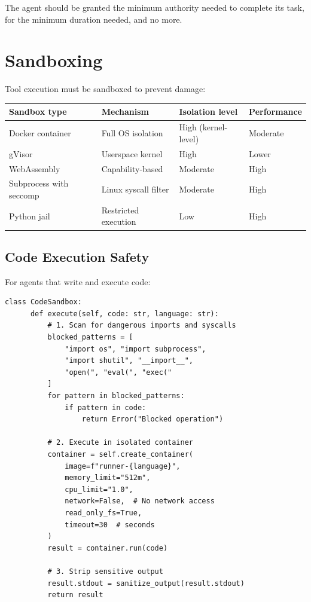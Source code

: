 \begin{definition}
	The agent should be granted the minimum authority needed to complete its task, for the minimum duration needed, and no more.
\end{definition}

\section{Sandboxing}

Tool execution must be sandboxed to prevent damage:

\begin{longtable}{p{3cm}p{4cm}p{4cm}p{3cm}}
	\toprule
	\textbf{Sandbox type}   & \textbf{Mechanism}   & \textbf{Isolation level} & \textbf{Performance} \\
	\midrule
	Docker container        & Full OS isolation    & High (kernel-level)      & Moderate             \\
	gVisor                  & Userspace kernel     & High                     & Lower                \\
	WebAssembly             & Capability-based     & Moderate                 & High                 \\
	Subprocess with seccomp & Linux syscall filter & Moderate                 & High                 \\
	Python jail             & Restricted execution & Low                      & High                 \\
	\bottomrule
\end{longtable}

\subsection{Code Execution Safety}

For agents that write and execute code:

\begin{lstlisting}[caption=Code execution sandbox]
  class CodeSandbox:
      def execute(self, code: str, language: str):
          # 1. Scan for dangerous imports and syscalls
          blocked_patterns = [
              "import os", "import subprocess",
              "import shutil", "__import__",
              "open(", "eval(", "exec("
          ]
          for pattern in blocked_patterns:
              if pattern in code:
                  return Error("Blocked operation")

          # 2. Execute in isolated container
          container = self.create_container(
              image=f"runner-{language}",
              memory_limit="512m",
              cpu_limit="1.0",
              network=False,  # No network access
              read_only_fs=True,
              timeout=30  # seconds
          )
          result = container.run(code)

          # 3. Strip sensitive output
          result.stdout = sanitize_output(result.stdout)
          return result
\end{lstlisting}

